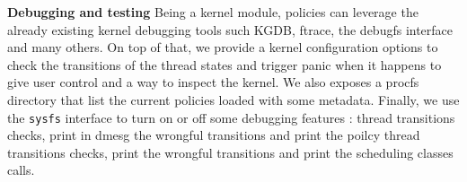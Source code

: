 \par \textbf{Debugging and testing} Being a kernel module, policies can leverage the already existing kernel debugging tools such KGDB\cite{kgdb}, ftrace, the debugfs interface and many others. On top of that, we provide a kernel configuration options to check the transitions of the thread states and trigger panic when it happens to give user control and a way to inspect the kernel. We also exposes a procfs directory that list the current policies loaded with some metadata. Finally, we use the \texttt{sysfs} interface to turn on or off some debugging features : thread transitions checks, print in dmesg the wrongful transitions and print the poilcy
thread transitions checks, print the wrongful transitions and print the scheduling classes calls. \newline




